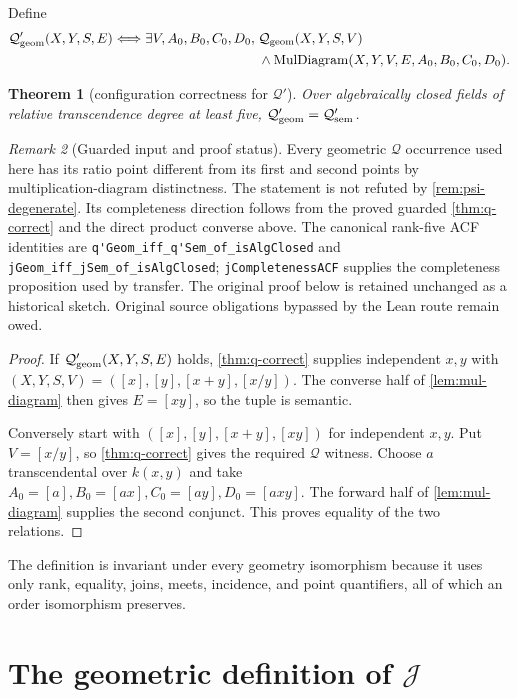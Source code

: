 \documentclass[11pt,oneside]{article}
\newtheorem{theorem}{Theorem}[section]
\theoremstyle{definition}
\theoremstyle{remark}
\newtheorem{remark}[theorem]{Remark}
\newcommand{\Qrel}{\mathcal{Q}}
\newcommand{\Qprel}{\mathcal{Q}'}
\newcommand{\Jrel}{\mathcal{J}}
\newcommand{\lean}[1]{\nolinkurl{#1}}
\begin{document}
Define
\[
\begin{split}
\Qprel_{\rm geom}(X,Y,S,E)\Longleftrightarrow
\exists V,A_0,B_0,C_0,D_0,\;&\Qrel_{\rm geom}(X,Y,S,V)\\
&\land\operatorname{MulDiagram}(X,Y,V,E,A_0,B_0,C_0,D_0).
\end{split}
\]
\begin{theorem}[configuration correctness for $\Qprel$]\label{thm:qp-correct}
Over algebraically closed fields of relative transcendence degree at least five,
$\Qprel_{\rm geom}=\Qprel_{\rm sem}$.
\end{theorem}
\begin{remark}[Guarded input and proof status]
Every geometric $\Qrel$ occurrence used here has its ratio point different from
its first and second points by multiplication-diagram distinctness.  The statement
is not refuted by \cref{rem:psi-degenerate}.  Its completeness direction follows from the
proved guarded \cref{thm:q-correct} and the direct product converse above.  The canonical
rank-five ACF identities are \lean{q'Geom_iff_q'Sem_of_isAlgClosed} and
\lean{jGeom_iff_jSem_of_isAlgClosed}; \lean{jCompletenessACF} supplies the completeness
proposition used by transfer.  The original proof below is retained unchanged as a
historical sketch.  Original source obligations bypassed by the Lean route remain owed.
\end{remark}
\begin{proof}
If $\Qprel_{\rm geom}(X,Y,S,E)$ holds, \cref{thm:q-correct} supplies independent
$x,y$ with
$(X,Y,S,V)=([x],[y],[x+y],[x/y])$.  The converse half of
\cref{lem:mul-diagram} then gives $E=[xy]$, so the tuple is semantic.

Conversely start with $([x],[y],[x+y],[xy])$ for independent $x,y$.  Put
$V=[x/y]$, so \cref{thm:q-correct} gives the required $\Qrel$ witness.  Choose
$a$ transcendental over $k(x,y)$ and take
$A_0=[a],B_0=[ax],C_0=[ay],D_0=[axy]$.  The forward half of
\cref{lem:mul-diagram} supplies the second conjunct.  This proves equality of the two
relations.
\end{proof}

The definition is invariant under every geometry isomorphism because it uses only rank,
equality, joins, meets, incidence, and point quantifiers, all of which an order isomorphism
preserves.

\section[The geometric definition of J]
{The geometric definition of $\Jrel$}
\end{document}
